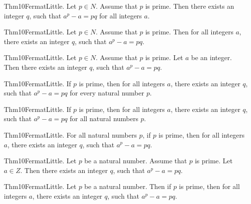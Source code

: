 \documentclass{article}
\begin{document}
Thm10FermatLittle. Let $p \in N$. Assume that $p$ is prime. Then there exists an integer $q$, such that $a ^ {p}- a = p q$ for all integers $a$.

Thm10FermatLittle. Let $p \in N$. Assume that $p$ is prime. Then for all integers $a$, there exists an integer $q$, such that $a ^ {p}- a = p q$.

Thm10FermatLittle. Let $p \in N$. Assume that $p$ is prime. Let $a$ be an integer. Then there exists an integer $q$, such that $a ^ {p}- a = p q$.

Thm10FermatLittle. If $p$ is prime, then for all integers $a$, there exists an integer $q$, such that $a ^ {p}- a = p q$ for every natural number $p$.

Thm10FermatLittle. If $p$ is prime, then for all integers $a$, there exists an integer $q$, such that $a ^ {p}- a = p q$ for all natural numbers $p$.

Thm10FermatLittle. For all natural numbers $p$, if $p$ is prime, then for all integers $a$, there exists an integer $q$, such that $a ^ {p}- a = p q$.

Thm10FermatLittle. Let $p$ be a natural number. Assume that $p$ is prime. Let $a \in Z$. Then there exists an integer $q$, such that $a ^ {p}- a = p q$.

Thm10FermatLittle. Let $p$ be a natural number. Then if $p$ is prime, then for all integers $a$, there exists an integer $q$, such that $a ^ {p}- a = p q$.
\end{document}
